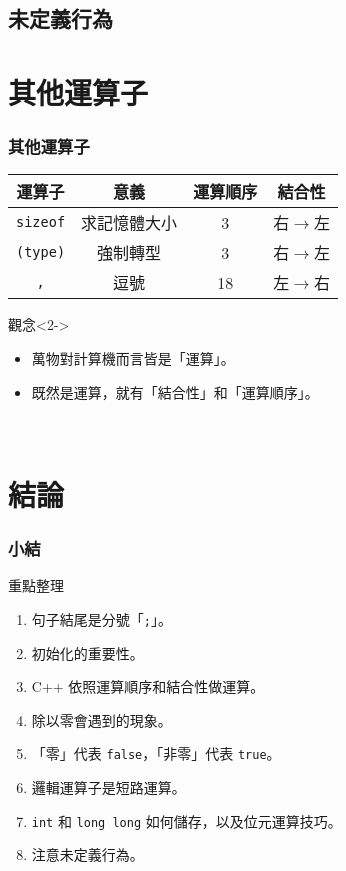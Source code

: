 \documentclass[utf8]{beamer}
\begin{document}
\begin{CJK}{UTF8}{bkai}
\subsection{未定義行為}

\section{其他運算子}

\begin{frame}[fragile]
  \frametitle{其他運算子}
  \begin{table}[h]
    \begin{tabular}{|c|c|c|c|}
    \hline
    運算子                & 意義       & 運算順序 & 結合性\\
    \hline
    \lstinline{sizeof}{} & 求記憶體大小 & 3      & \alert{右$\rightarrow$左}\\
    \hline
    \lstinline{(type)}{} & 強制轉型    & 3      & \alert{右$\rightarrow$左}\\
    \hline
    \lstinline{,}{}      & 逗號       & 18      & 左$\rightarrow$右\\
    \hline
    \end{tabular}
  \end{table}
  \begin{alertblock}{觀念}<2->
    \begin{itemize}
    \item 萬物對計算機而言皆是「\alert{運算}」。
    \item<3-> 既然是運算，就有「結合性」和「運算順序」。
    \end{itemize}
  \end{alertblock}
\end{frame}

\begin{frame}
  \
\end{frame}

\section{結論}

\begin{frame}[fragile]
  \frametitle{小結}
  \begin{alertblock}{重點整理}
    \begin{enumerate}[<+->]
    \item 句子結尾是分號「\lstinline{;}{}」。
    \item 初始化的重要性。
    \item C++ 依照運算順序和結合性做運算。
    \item 除以零會遇到的現象。
    \item 「零」代表 \lstinline{false}{}，「非零」代表 \lstinline{true}{}。
    \item 邏輯運算子是短路運算。
    \item \lstinline{int}{} 和 \lstinline{long long}{} 如何儲存，以及位元運算技巧。
    \item 注意未定義行為。
    \end{enumerate}
  \end{alertblock}
\end{frame}

\clearpage
\end{CJK}
\end{document}
